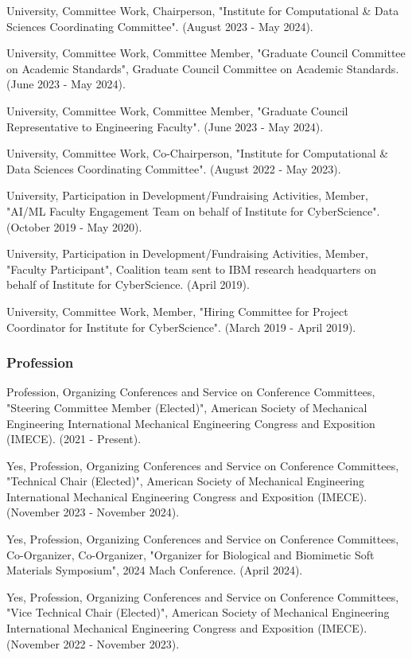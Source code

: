 \documentclass[
]{article}
\begin{document}
University, Committee Work, Chairperson, "Institute for Computational \&
Data Sciences Coordinating Committee". (August 2023 - May 2024).

University, Committee Work, Committee Member, "Graduate Council
Committee on Academic Standards", Graduate Council Committee on Academic
Standards. (June 2023 - May 2024).

University, Committee Work, Committee Member, "Graduate Council
Representative to Engineering Faculty". (June 2023 - May 2024).

University, Committee Work, Co-Chairperson, "Institute for Computational
\& Data Sciences Coordinating Committee". (August 2022 - May 2023).

University, Participation in Development/Fundraising Activities, Member,
"AI/ML Faculty Engagement Team on behalf of Institute for CyberScience".
(October 2019 - May 2020).

University, Participation in Development/Fundraising Activities, Member,
"Faculty Participant", Coalition team sent to IBM research headquarters
on behalf of Institute for CyberScience. (April 2019).

University, Committee Work, Member, "Hiring Committee for Project
Coordinator for Institute for CyberScience". (March 2019 - April 2019).

\subsubsection{Profession}\label{profession}

Profession, Organizing Conferences and Service on Conference Committees,
"Steering Committee Member (Elected)", American Society of Mechanical
Engineering International Mechanical Engineering Congress and Exposition
(IMECE). (2021 - Present).

Yes, Profession, Organizing Conferences and Service on Conference
Committees, "Technical Chair (Elected)", American Society of Mechanical
Engineering International Mechanical Engineering Congress and Exposition
(IMECE). (November 2023 - November 2024).

Yes, Profession, Organizing Conferences and Service on Conference
Committees, Co-Organizer, Co-Organizer, "Organizer for Biological and
Biomimetic Soft Materials Symposium", 2024 Mach Conference. (April
2024).

Yes, Profession, Organizing Conferences and Service on Conference
Committees, "Vice Technical Chair (Elected)", American Society of
Mechanical Engineering International Mechanical Engineering Congress and
Exposition (IMECE). (November 2022 - November 2023).
\end{document}
